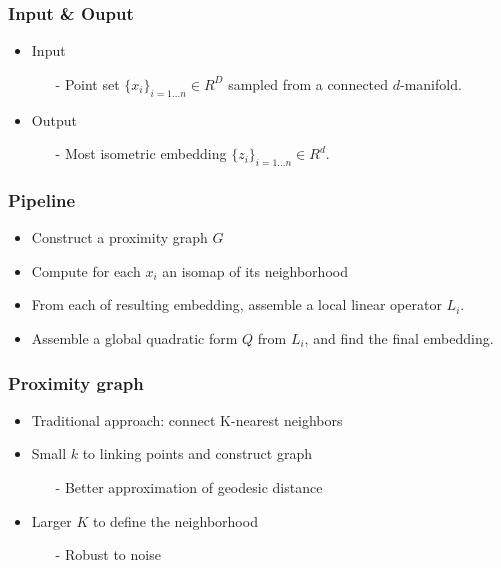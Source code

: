 \documentclass[serif,mathserif, 12pt]{beamer}
\begin{document}
\begin{frame}
  \frametitle{Input \& Ouput}
  \begin{itemize}
  \item Input
    \begin{itemize}
    \item[-] Point set $\{x_i\}_{i=1...n} \in R^D$ sampled from a connected $d$-manifold.
    \end{itemize}
  \item Output
    \begin{itemize}
    \item[-] Most isometric embedding $\{z_i\}_{i=1\dots n} \in R^d$.
    \end{itemize}
  \end{itemize}
\end{frame}

\begin{frame}
  \frametitle{Pipeline}
  \begin{itemize}
  \item Construct a proximity graph $G$
  \item Compute for each $x_i$ an isomap of its neighborhood
  \item From each of resulting embedding, assemble a local linear
    operator $L_i$.
  \item Assemble a global quadratic form $Q$ from $L_i$, and
    find the final embedding.
  \end{itemize}
\end{frame}

\begin{frame}
  \frametitle{Proximity graph}
  \begin{itemize}
  \item Traditional approach: connect K-nearest neighbors
  \item Small $k$ to linking points and construct graph
    \begin{itemize}
    \item[-] Better approximation of geodesic distance
    \end{itemize}
  \item Larger $K$ to define the neighborhood
    \begin{itemize}
    \item[-] Robust to noise
    \end{itemize}
  \end{itemize}
\end{frame}
\end{document}
